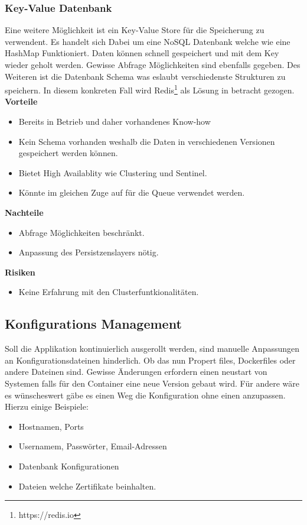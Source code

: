 \subsubsection{Key-Value Datenbank}

Eine weitere Möglichkeit ist ein Key-Value Store für die Speicherung zu verwendent. Es handelt sich Dabei um eine NoSQL Datenbank welche wie eine HashMap Funktioniert. Daten können schnell gespeichert und mit dem Key wieder geholt werden. Gewisse Abfrage Möglichkeiten sind ebenfalls gegeben. Des Weiteren ist die Datenbank Schema was eslaubt verschiedenste Strukturen zu speichern. In diesem konkreten Fall wird Redis\footnote{https://redis.io} als Lösung in betracht gezogen. \newline
\newline
\textbf{Vorteile}
\begin{itemize}
	\item Bereits in Betrieb und daher vorhandenes Know-how
	\item Kein Schema vorhanden weshalb die Daten in verschiedenen Versionen gespeichert werden können.
	\item Bietet High Availablity wie Clustering und Sentinel.
	\item Könnte im gleichen Zuge auf für die Queue verwendet werden.	
\end{itemize}
\textbf{Nachteile}
\begin{itemize}
	\item Abfrage Möglichkeiten beschränkt.
	\item Anpassung des Persistzenslayers nötig.
\end{itemize}
\textbf{Risiken}
\begin{itemize}
	\item Keine Erfahrung mit den Clusterfuntkionalitäten.
\end{itemize}

\subsection{Konfigurations Management}

Soll die Applikation kontinuierlich ausgerollt werden, sind manuelle Anpassungen an Konfigurationsdateinen hinderlich. Ob das nun Propert files, Dockerfiles oder andere Dateinen sind. Gewisse Änderungen erfordern einen neustart von Systemen falls für den Container eine neue Version gebaut wird. Für andere wäre es wünscheswert gäbe es einen Weg die Konfiguration ohne einen anzupassen. Hierzu einige Beispiele:\newline
\begin{itemize}
	\item Hostnamen, Ports
	\item Usernamem, Passwörter, Email-Adressen
	\item Datenbank Konfigurationen
	\item Dateien welche Zertifikate beinhalten.
\end{itemize}

